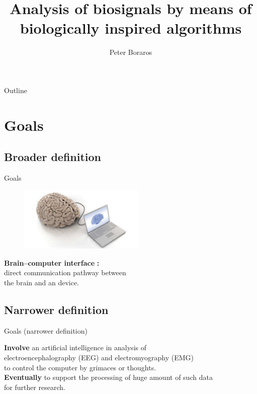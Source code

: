 \documentclass{beamer}
\title[Analysis of biosignals]{Analysis of biosignals by means of\\ biologically inspired algorithms}
\author{Peter Boraros}
\begin{document}
\begin{frame}
\titlepage
\end{frame}


\begin{frame}{Outline}
\tableofcontents[pausesections]
\end{frame}

\section{Goals}

\subsection*{Broader definition}
\begin{frame}{Goals}
	\begin{figure}[h]
		\centering
		\includegraphics[width=60mm]{brain_computer}
		\label{filters}
	\end{figure}	
	\pause
	\begin{center}
		\textbf{Brain–computer interface}%
		\pause
		\textbf{:}\\
		direct communication pathway between\\ the brain and an device.
	\end{center}
\end{frame}

\subsection*{Narrower definition}
\begin{frame}{Goals (narrower definition) }
\begin{center}
\textbf{Involve} \pause 
an artificial intelligence  in analysis of
\\electroencephalography (EEG) and electromyography (EMG) \pause
\\to control the computer by grimaces or thoughts.\pause
\\\textbf{Eventually} \pause
to support the processing of huge amount of such data 
\\for further research.
\end{center}
\end{frame}
\end{document}
